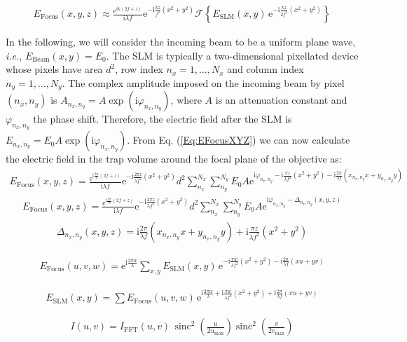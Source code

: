 \documentclass[a4paper,11pt,onecolumn]{scrartcl}
\renewcommand{\i}{\mathrm i}
\newcommand{\e}{\mathrm e}
\DeclareMathOperator{\sinc}{sinc}
\begin{document}
\begin{align}
\boxed{
E_\mathrm{Focus}(x,y,z) \approx \frac{\mathrm e^{\i k(2f + z)}}{\i\lambda f}\e^{-\i\frac{kz}{f^2}(x^2+y^2)}\mathcal F\left\{E_\mathrm{SLM}(x, y)\,\e^{-\i\frac{kz}{2f^2}(x^2 + y^2)}\right\}
}
\label{Eq:EFocusXYZ}
\end{align}

In the following, we will consider the incoming beam to be a uniform plane wave, \textit{i.e.}, $E_\mathrm{Beam}(x, y) = E_0$. The SLM is typically a two-dimensional pixellated device whose pixels have area $d^2$, row index $n_x = 1, \dots , N_x$ and column index $n_y = 1, \dots , N_y$. The complex amplitude imposed on the incoming beam by pixel $(n_x , n_y)$ is $A_{n_x, n_y} = A \exp(\i\varphi_{n_x ,n_y})$, where $A$ is an attenuation constant and $\varphi_{n_x ,n_y}$ the phase shift. Therefore, the electric field after the SLM is $E_{n_x, n_y} = E_0 A \exp(\i\varphi_{n_x ,n_y})$. From Eq. (\ref{Eq:EFocusXYZ}) we can now calculate the electric field in the trap volume around the focal plane of the objective as:
\begin{align}
E_\mathrm{Focus}(x,y,z) = \frac{\mathrm e^{\i \frac{2\pi}{\lambda}(2f + z)}}{\i\lambda f}\e^{-\i\frac{2\pi z}{\lambda f^2}(x^2+y^2)}d^2\sum_{n_x}^{N_x}\sum_{n_y}^{N_y} E_0 A\mathrm e^{\mathrm i \varphi_{n_x ,n_y} -\i\frac{\pi z}{\lambda f^2}(x^2 + y^2) -\i\frac{2\pi}{\lambda f}(x_{n_x,n_y} x + y_{n_x,n_y}y)}
\end{align}
\begin{align}
E_\mathrm{Focus}(x,y,z) = \frac{\mathrm e^{\i \frac{2\pi}{\lambda}(2f + z)}}{\i\lambda f}\e^{-\i\frac{2\pi z}{\lambda f^2}(x^2+y^2)}d^2\sum_{n_x}^{N_x}\sum_{n_y}^{N_y} E_0 A\mathrm e^{\mathrm i \varphi_{n_x ,n_y} - \Delta_{n_x ,n_y}(x, y, z)}
\end{align}
\begin{align}
\Delta_{n_x ,n_y}(x, y ,z) = \i\frac{2\pi}{\lambda f}(x_{n_x,n_y} x + y_{n_x,n_y}y) + \i\frac{\pi z}{\lambda f^2}(x^2 + y^2)
\end{align}


\begin{align}
E_\mathrm{Focus}(u,v,w) = \e^{\i\frac{2\pi w}{\lambda}}\sum_{x,y} E_\mathrm{SLM}(x,y)\,\e^{-\i\frac{\pi w}{\lambda f^2}(x^2 + y^2)-\i\frac{2\pi}{\lambda f}(x u + y v)}
\end{align}

\begin{align}
E_\mathrm{SLM}(x, y) = \sum E_\mathrm{Focus}(u,v,w)\,\e^{\i\frac{2\pi w}{\lambda}+\i\frac{\pi w}{\lambda f^2}(x^2 + y^2)+\i\frac{2\pi}{\lambda f}(x u + y v)}
\end{align}

\begin{align}
I(u,v) = I_\mathrm{FFT}(u,v)\, \sinc^2\left(\frac{u}{2u_\mathrm{max}}\right)\sinc^2\left(\frac{v}{2v_\mathrm{max}}\right)
\end{align}
\end{document}
